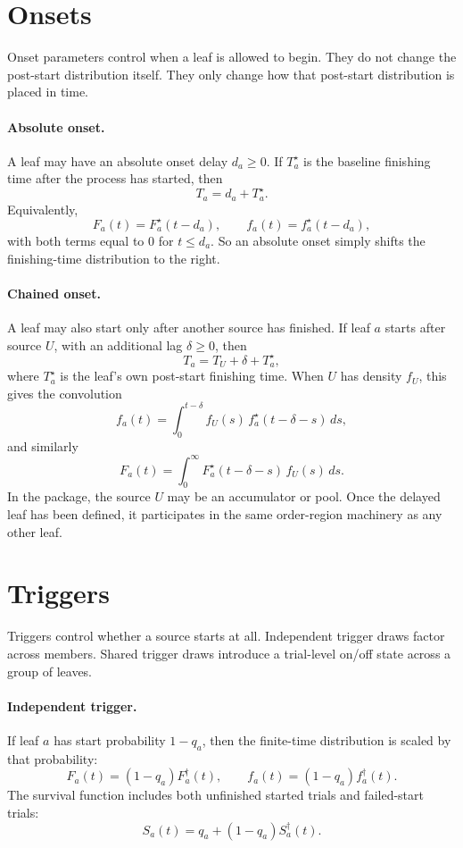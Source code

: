 \documentclass[11pt]{article}
\begin{document}
\section{Onsets}

Onset parameters control when a leaf is allowed to begin. They do not change
the post-start distribution itself. They only change how that post-start
distribution is placed in time.

\paragraph{Absolute onset.}
A leaf may have an absolute onset delay $d_a \ge 0$. If $T_a^\star$ is the
baseline finishing time after the process has started, then
\[
T_a = d_a + T_a^\star.
\]
Equivalently,
\[
F_a(t) = F_a^\star(t-d_a), \qquad
f_a(t) = f_a^\star(t-d_a),
\]
with both terms equal to $0$ for $t \le d_a$. So an absolute onset simply
shifts the finishing-time distribution to the right.

\paragraph{Chained onset.}
A leaf may also start only after another source has finished. If leaf $a$
starts after source $U$, with an additional lag $\delta \ge 0$, then
\[
T_a = T_U + \delta + T_a^\star,
\]
where $T_a^\star$ is the leaf's own post-start finishing time. When $U$ has
density $f_U$, this gives the convolution
\begin{equation}
f_a(t)
=
\int_0^{t-\delta}
f_U(s)\,f_a^\star(t-\delta-s)\,ds,
\label{eq:after-density}
\end{equation}
and similarly
\begin{equation}
F_a(t)
=
\int_0^\infty
F_a^\star(t-\delta-s)\,f_U(s)\,ds.
\label{eq:after-cdf}
\end{equation}
In the package, the source $U$ may be an accumulator or pool. Once the delayed
leaf has been defined, it participates in the same order-region machinery as
any other leaf.

\section{Triggers}

Triggers control whether a source starts at all. Independent trigger draws
factor across members. Shared trigger draws introduce a trial-level on/off
state across a group of leaves.

\paragraph{Independent trigger.}
If leaf $a$ has start probability $1-q_a$, then the finite-time distribution is
scaled by that probability:
\begin{equation}
F_a(t) = (1-q_a)F_a^\dagger(t),
\qquad
f_a(t) = (1-q_a)f_a^\dagger(t).
\label{eq:ind-trigger}
\end{equation}
The survival function includes both unfinished started trials and failed-start
trials:
\[
S_a(t) = q_a + (1-q_a)S_a^\dagger(t).
\]
\end{document}
